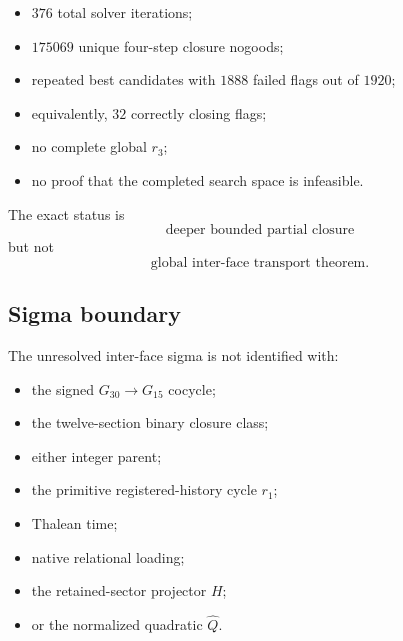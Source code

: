 \begin{itemize}

\item \(376\) total solver iterations;

\item \(175069\) unique four-step closure nogoods;

\item repeated best candidates with \(1888\) failed flags out of
\(1920\);

\item equivalently, \(32\) correctly closing flags;

\item no complete global \(r_3\);

\item no proof that the completed search space is infeasible.

\end{itemize}

The exact status is
\[
\text{deeper bounded partial closure}
\]
but not
\[
\text{global inter-face transport theorem}.
\]

\subsection{Sigma boundary}

The unresolved inter-face sigma is not identified with:

\begin{itemize}

\item the signed \(G_{30}\to G_{15}\) cocycle;

\item the twelve-section binary closure class;

\item either integer parent;

\item the primitive registered-history cycle \(r_1\);

\item Thalean time;

\item native relational loading;

\item the retained-sector projector \(H\);

\item or the normalized quadratic \(\widehat Q\).

\end{itemize}

